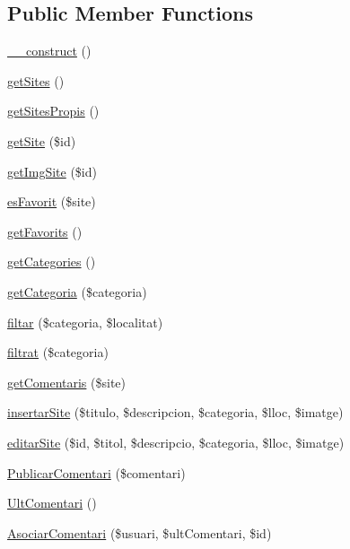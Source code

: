 \subsection*{Public Member Functions}
\begin{DoxyCompactItemize}
\item 
\hyperlink{classsites_model_a095c5d389db211932136b53f25f39685}{\+\_\+\+\_\+construct} ()
\item 
\hyperlink{classsites_model_ab6f9b5403cf9de7de7b5916494516628}{get\+Sites} ()
\item 
\hyperlink{classsites_model_a242f198759893dd32f42f298119f7464}{get\+Sites\+Propis} ()
\item 
\hyperlink{classsites_model_a095a92d58ce230e6c035c70f31c1c316}{get\+Site} (\$id)
\item 
\hyperlink{classsites_model_a5bb4eefd57223702d13525978302a198}{get\+Img\+Site} (\$id)
\item 
\hyperlink{classsites_model_a650749dbd8c9d74a05c52334ae5e2e6f}{es\+Favorit} (\$site)
\item 
\hyperlink{classsites_model_a26e87e12de82b921fc99022d92256369}{get\+Favorits} ()
\item 
\hyperlink{classsites_model_a8729ba486702e7e12a3fff08965e1e7f}{get\+Categories} ()
\item 
\hyperlink{classsites_model_adb8e9f482b330fd4cdbe13e1bb6f6c6b}{get\+Categoria} (\$categoria)
\item 
\hyperlink{classsites_model_a331aad224ca1e00f766c748e515aa301}{filtar} (\$categoria, \$localitat)
\item 
\hyperlink{classsites_model_a7d1a0ba81511e0d2a2fafb248ab2d9bd}{filtrat} (\$categoria)
\item 
\hyperlink{classsites_model_ae750a6bacf0149e902862e16addc8f6d}{get\+Comentaris} (\$site)
\item 
\hyperlink{classsites_model_a6b833e3307aad337dc9bd6862161234b}{insertar\+Site} (\$titulo, \$descripcion, \$categoria, \$lloc, \$imatge)
\item 
\hyperlink{classsites_model_adeb62a780107d6d8169f3634f6c517d3}{editar\+Site} (\$id, \$titol, \$descripcio, \$categoria, \$lloc, \$imatge)
\item 
\hyperlink{classsites_model_aee2f04ffeca27721c7e531c0b2093b00}{Publicar\+Comentari} (\$comentari)
\item 
\hyperlink{classsites_model_a7b69e502ac72c0b6ca036a1f97a1b435}{Ult\+Comentari} ()
\item 
\hyperlink{classsites_model_a00b50f40c8524faecd78c3bbd8c82516}{Asociar\+Comentari} (\$usuari, \$ult\+Comentari, \$id)
\end{DoxyCompactItemize}
